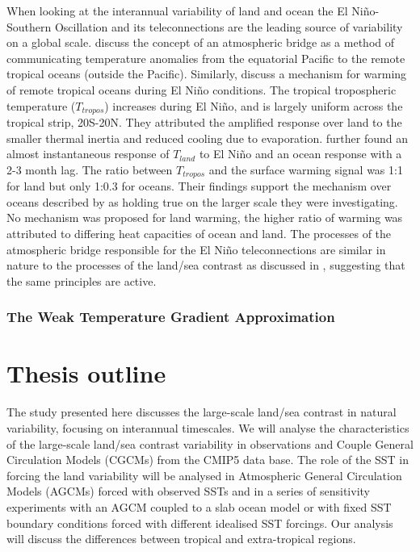 When looking at the interannual variability of land and ocean the El 
Ni{\~n}o-Southern Oscillation and its teleconnections are the leading source of 
variability on a global scale. \citet*{Klein1999} discuss the concept of an 
atmospheric bridge as a method of communicating temperature anomalies from the 
equatorial Pacific to the remote tropical oceans (outside the Pacific).  
Similarly, \citet*{Chiang2002} discuss a mechanism for warming of remote 
tropical oceans during El Ni{\~n}o conditions. The tropical tropospheric 
temperature ($T_{tropos}$) increases during El Ni{\~n}o, and is largely uniform 
across the tropical strip, 20S-20N.  They attributed the amplified response over 
land to the smaller thermal inertia and reduced cooling due to evaporation.  
\citet*{Chiang2005} further found an almost instantaneous response of $T_{land}$ 
to  El Ni{\~n}o and an ocean response with a 2-3 month lag.  The ratio between 
$T_{tropos}$ and the surface warming signal was 1:1 for land but only 1:0.3 for 
oceans.  Their findings support the mechanism over oceans described by 
\citet*{Chiang2002} as holding true on the larger scale they were investigating.  
No mechanism was proposed for land warming, the higher ratio of warming was 
attributed to differing heat capacities of ocean and land. The processes of the 
atmospheric bridge responsible for the El Ni{\~n}o teleconnections are similar 
in nature to the processes of the land/sea contrast as discussed in 
\citet{Joshi2008}, suggesting that the same principles are active.

\subsubsection{The Weak Temperature Gradient Approximation}\label{sssec:wtg}


\section{Thesis outline}

The study presented here discusses the large-scale land/sea contrast in natural 
variability, focusing on interannual timescales. We will analyse the 
characteristics of the large-scale land/sea contrast variability in observations 
and Couple General Circulation Models (CGCMs) from the CMIP5 data base. The role 
of the SST in forcing the land variability will be analysed in Atmospheric 
General Circulation Models (AGCMs) forced with observed SSTs and in a series of 
sensitivity experiments with an AGCM coupled to a slab ocean model or with fixed 
SST boundary conditions forced with different idealised SST forcings.  Our 
analysis will discuss the differences between tropical and extra-tropical 
regions.

